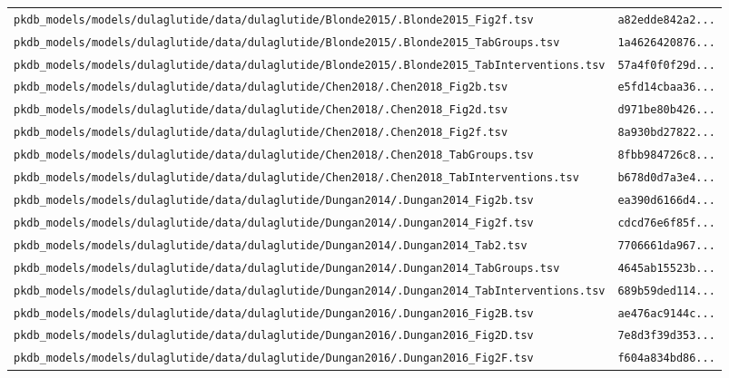 \begin{longtable}{ll}
\texttt{pkdb\_models/models/dulaglutide/data/dulaglutide/Blonde2015/.Blonde2015\_Fig2f.tsv} & \texttt{a82edde842a2...} \\
\texttt{pkdb\_models/models/dulaglutide/data/dulaglutide/Blonde2015/.Blonde2015\_TabGroups.tsv} & \texttt{1a4626420876...} \\
\texttt{pkdb\_models/models/dulaglutide/data/dulaglutide/Blonde2015/.Blonde2015\_TabInterventions.tsv} & \texttt{57a4f0f0f29d...} \\
\texttt{pkdb\_models/models/dulaglutide/data/dulaglutide/Chen2018/.Chen2018\_Fig2b.tsv} & \texttt{e5fd14cbaa36...} \\
\texttt{pkdb\_models/models/dulaglutide/data/dulaglutide/Chen2018/.Chen2018\_Fig2d.tsv} & \texttt{d971be80b426...} \\
\texttt{pkdb\_models/models/dulaglutide/data/dulaglutide/Chen2018/.Chen2018\_Fig2f.tsv} & \texttt{8a930bd27822...} \\
\texttt{pkdb\_models/models/dulaglutide/data/dulaglutide/Chen2018/.Chen2018\_TabGroups.tsv} & \texttt{8fbb984726c8...} \\
\texttt{pkdb\_models/models/dulaglutide/data/dulaglutide/Chen2018/.Chen2018\_TabInterventions.tsv} & \texttt{b678d0d7a3e4...} \\
\texttt{pkdb\_models/models/dulaglutide/data/dulaglutide/Dungan2014/.Dungan2014\_Fig2b.tsv} & \texttt{ea390d6166d4...} \\
\texttt{pkdb\_models/models/dulaglutide/data/dulaglutide/Dungan2014/.Dungan2014\_Fig2f.tsv} & \texttt{cdcd76e6f85f...} \\
\texttt{pkdb\_models/models/dulaglutide/data/dulaglutide/Dungan2014/.Dungan2014\_Tab2.tsv} & \texttt{7706661da967...} \\
\texttt{pkdb\_models/models/dulaglutide/data/dulaglutide/Dungan2014/.Dungan2014\_TabGroups.tsv} & \texttt{4645ab15523b...} \\
\texttt{pkdb\_models/models/dulaglutide/data/dulaglutide/Dungan2014/.Dungan2014\_TabInterventions.tsv} & \texttt{689b59ded114...} \\
\texttt{pkdb\_models/models/dulaglutide/data/dulaglutide/Dungan2016/.Dungan2016\_Fig2B.tsv} & \texttt{ae476ac9144c...} \\
\texttt{pkdb\_models/models/dulaglutide/data/dulaglutide/Dungan2016/.Dungan2016\_Fig2D.tsv} & \texttt{7e8d3f39d353...} \\
\texttt{pkdb\_models/models/dulaglutide/data/dulaglutide/Dungan2016/.Dungan2016\_Fig2F.tsv} & \texttt{f604a834bd86...} \\

\end{longtable}
